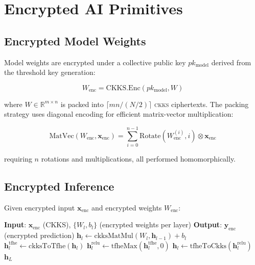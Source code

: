 \documentclass[11pt,letterpaper]{article}
\newcommand{\CKKS}{\textsc{ckks}}
\begin{document}
\section{Encrypted AI Primitives}
\label{sec:primitives}

\subsection{Encrypted Model Weights}

Model weights are encrypted under a collective public key $pk_{\text{model}}$ derived from the threshold key generation:

\begin{equation}
W_{\text{enc}} = \text{CKKS.Enc}(pk_{\text{model}}, W)
\end{equation}

where $W \in \mathbb{R}^{m \times n}$ is packed into $\lceil mn / (N/2) \rceil$ \CKKS{} ciphertexts. The packing strategy uses diagonal encoding for efficient matrix-vector multiplication:

\begin{equation}
\text{MatVec}(W_{\text{enc}}, \mathbf{x}_{\text{enc}}) = \sum_{i=0}^{n-1} \text{Rotate}(W_{\text{enc}}^{(i)}, i) \otimes \mathbf{x}_{\text{enc}}
\end{equation}

requiring $n$ rotations and multiplications, all performed homomorphically.

\subsection{Encrypted Inference}

Given encrypted input $\mathbf{x}_{\text{enc}}$ and encrypted weights $W_{\text{enc}}$:

\begin{algorithm}[t]
\caption{Encrypted Neural Network Inference}
\label{alg:inference}
\begin{algorithmic}[1]
\STATE \textbf{Input}: $\mathbf{x}_{\text{enc}}$ (CKKS), $\{W_l, b_l\}$ (encrypted weights per layer)
\STATE \textbf{Output}: $\mathbf{y}_{\text{enc}}$ (encrypted prediction)
    \STATE $\mathbf{h}_l \leftarrow \text{ckksMatMul}(W_l, \mathbf{h}_{l-1}) + b_l$ 
        \STATE $\mathbf{h}_l^{\text{tfhe}} \leftarrow \text{ckksToTfhe}(\mathbf{h}_l)$ 
        \STATE $\mathbf{h}_l^{\text{relu}} \leftarrow \text{tfheMax}(\mathbf{h}_l^{\text{tfhe}}, 0)$ 
        \STATE $\mathbf{h}_l \leftarrow \text{tfheToCkks}(\mathbf{h}_l^{\text{relu}})$ 
    \ENDIF
\ENDFOR
\RETURN $\mathbf{h}_L$
\end{algorithmic}
\end{algorithm}
\end{document}
